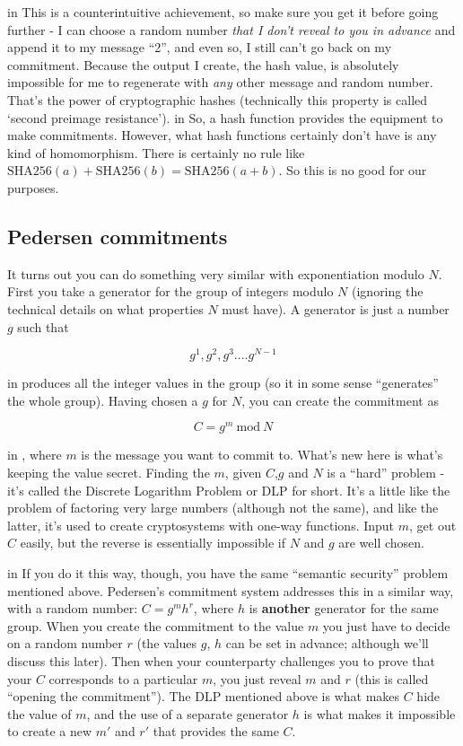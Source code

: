 \documentclass[10pt,a4paper]{article}
\begin{document}
 in \noindent This is a counterintuitive achievement, so make sure you get it before going further - I can choose a random number \textit{that I don't reveal to you in advance} and append it to my message ``2'', and even so, I still can't go back on my commitment. Because the output I create, the hash value, is absolutely impossible for me to regenerate with \textit{any} other message and random number. That's the power of cryptographic hashes (technically this property is called `second preimage resistance').
 in \noindent So, a hash function provides the equipment to make commitments. However, what hash functions certainly don't have is any kind of homomorphism. There is certainly no rule like $\textrm{SHA256}(a) + \textrm{SHA256}(b) = \textrm{SHA256}(a+b)$. So this is no good for our purposes.

\subsection{Pedersen commitments}

It turns out you can do something very similar with exponentiation modulo $N$. First you take a generator for the group of integers modulo $N$ (ignoring the technical details on what properties $N$ must have). A generator is just a number $g$ such that

\[g^1, g^2, g^3 .... g^{N-1} \]

 in \noindent produces all the integer values in the group (so it in some sense ``generates'' the whole group). Having chosen a $g$ for $N$, you can create the commitment as

\[C = g^m \ \textrm{mod}\ N \]

 in \noindent , where $m$ is the message you want to commit to. What's new here is what's keeping the value secret. Finding the $m$, given $C$,$g$ and $N$ is a ``hard'' problem - it's called the Discrete Logarithm Problem or DLP for short. It's a little like the problem of factoring very large numbers (although not the same), and like the latter, it's used to create cryptosystems with one-way functions. Input $m$, get out $C$ easily, but the reverse is essentially impossible if $N$ and $g$ are well chosen.

 in \noindent If you do it this way, though, you have the same ``semantic security'' problem mentioned above. Pedersen's commitment system addresses this in a similar way, with a random number: $C = g^m h^r$, where $h$ is \textbf{another} generator for the same group. When you create the commitment to the value $m$ you just have to decide on a random number $r$ (the values $g$, $h$ can be set in advance; although we'll discuss this later). Then when your counterparty challenges you to prove that your $C$ corresponds to a particular $m$, you just reveal $m$ and $r$ (this is called ``opening the commitment''). The DLP mentioned above is what makes $C$ hide the value of $m$, and the use of a separate generator $h$ is what makes it impossible to create a new $m'$ and $r'$ that provides the same $C$.
\end{document}
